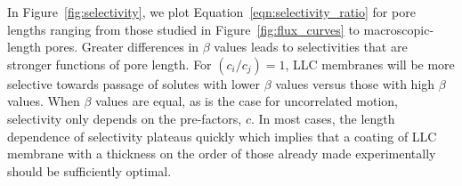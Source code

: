 \documentclass[12pt]{article}
\begin{document}
  In Figure~\ref{fig:selectivity}, we plot Equation~\ref{eqn:selectivity_ratio} for pore
  lengths ranging from those studied in Figure~\ref{fig:flux_curves} to macroscopic-length
  pores. Greater differences in $\beta$ values leads to selectivities that are stronger 
  functions of pore length. For $(c_i / c_j)=1$, LLC membranes will be more selective
  towards passage of solutes with lower $\beta$ values versus those with high $\beta$ values.
  When $\beta$ values are equal, as is the case for uncorrelated motion, selectivity only
  depends on the pre-factors, $c$. In most cases, the length dependence of selectivity 
  plateaus quickly which implies that a coating of LLC membrane with a thickness on the 
  order of those already made experimentally should be sufficiently optimal. 
\end{document}
